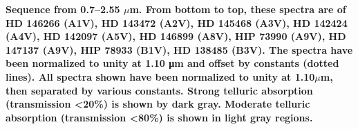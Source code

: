 {\bf Sequence from 0.7–2.55 $\mu$m. From bottom to top, these spectra are of HD 146266 (A1V), HD 143472 (A2V), HD 145468 (A3V), HD 142424 (A4V), HD 142097 (A5V), HD 146899 (A8V), HIP 73990 (A9V),
HD 147137 (A9V), HIP 78933 (B1V), HD 138485 (B3V).  The spectra have been normalized to unity at 1.10 μm and offset by constants (dotted lines).  All spectra shown have been normalized to unity at 1.10$\mu$m, then separated by various constants.  Strong telluric absorption (transmission <20\%) is shown by dark gray.  Moderate telluric absorption (transmission <80\%) is shown in light gray regions.\label{fig:stack-plot-a}}

